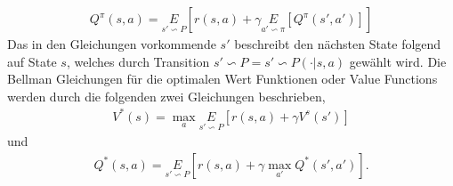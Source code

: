 \documentclass[]{iat}
\begin{document}
\begin{align}
    Q^{\pi}(s,a) = \underset{s' \backsim P}{E}\left[r(s,a)+\gamma \underset{a' \backsim \pi}{E}\left[Q^{\pi}(s',a')\right] \right] \label{eq:bellman_q_on_policy}
\end{align}
Das in den Gleichungen vorkommende $s'$ beschreibt den nächsten State folgend auf State $s$, welches durch Transition $s' \backsim P = s' \backsim P(\cdot |s,a)$ gewählt wird. Die Bellman Gleichungen für die optimalen Wert Funktionen oder Value Functions werden durch die folgenden zwei Gleichungen beschrieben,
\begin{align}
    V^*(s) = \max_a \underset{s'\backsim P}{E}\left[r(s,a)+\gamma V^s(s')\right] \label{eq:bellman_opv_on_policy}
\end{align}
und
\begin{align}
    Q^*(s,a) = \underset{s' \backsim P}{E}\left[r(s,a)+\gamma \max_{a'}Q^*(s', a')\right]. \label{eq:bellman_opq_on_policy}
\end{align} \cite[]{SpinningUp2018}
\end{document}

